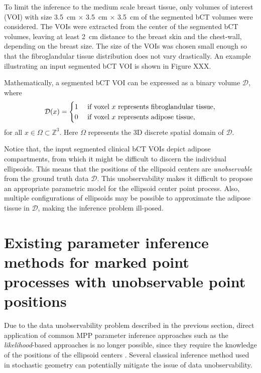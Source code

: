 \documentclass[journal]{IEEEtran}
\begin{document}
To limit the inference to the medium scale breast tissue, only volumes
of interest (VOI) with size \SI{3.5}{\cm} $\times$ \SI{3.5}{\cm}
$\times$ \SI{3.5}{\cm} of the segmented bCT volumes were
considered. The VOIs were extracted from the center of the segmented
bCT volumes, leaving at least \SI{2}{\cm} distance to the breast skin
and the chest-wall, depending on the breast size. The size of the VOIs
was chosen small enough so that the fibroglandular tissue distribution
does not vary drastically. An example illustrating an input segmented
bCT VOI is shown in Figure XXX.

Mathematically, a segmented bCT VOI can be expressed as a binary
volume $\mathcal{D}$, where
\begin{equation}
  \label{eq:bct-discrete-form}
  \mathcal{D}(x) =
  \begin{cases}
    1 & \textnormal{ if voxel } x \textnormal{ represents
      fibroglandular tissue}, \\
    0 & \textnormal{ if voxel } x \textnormal{ represents
      adipose tissue}, \\
  \end{cases}
\end{equation}
for all $x \in \Omega \subset \mathbb{Z}^3$. Here $\Omega$ represents
the 3D discrete spatial domain of $\mathcal{D}$.

Notice that, the input segmented clinical bCT VOIs depict adipose
compartments, from which it might be difficult to discern the
individual ellipsoids. This means that the positions of the ellipsoid
centers are \textit{unobservable} from the ground truth data
$\mathcal{D}$. This unobservability makes it difficult to propose an
appropriate parametric model for the ellipsoid center point
process. Also, multiple configurations of ellipsoids may be possible
to approximate the adipose tissue in $\mathcal{D}$, making the
inference problem ill-posed.

\section{Existing parameter inference methods for marked point
  processes with unobservable point positions}
\label{sec:exist-param-infer}

Due to the data unobservability problem described in the previous
section, direct application of common MPP parameter inference
approaches such as the \textit{likelihood}-based approaches
\cite{moller2003statistical} \cite{baddeley2000practical}
\cite{besag1975statistical} \cite{jensen1991pseudolikelihood} is no
longer possible, since they require the knowledge of the positions of
the ellipsoid centers \cite{dereudre2014estimation}. Several classical
inference method used in stochastic geometry can potentially mitigate
the issue of data unobservability.
\end{document}
